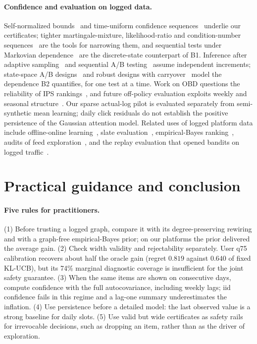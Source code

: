 \documentclass[sigconf,review,anonymous]{acmart}
\begin{document}
\paragraph{Confidence and evaluation on logged data.} Self-normalized bounds~\cite{abbasi2011improved} and time-uniform confidence sequences~\cite{howard2021confidence} underlie our certificates; tighter martingale-mixture, likelihood-ratio and condition-number sequences~\cite{flynn2023martingale,flynn2025kernel,emmenegger2023lr,lee2024glmcs,whitehouse2025vector,denoodt2026multivariate} are the tools for narrowing them, and sequential tests under Markovian dependence~\cite{sethi2026markovian} are the discrete-state counterpart of B1. Inference after adaptive sampling~\cite{du2025bvm,cho2024peak} and sequential A/B testing~\cite{kurennoy2025yeast,lindon2026delayed,kohavi2024false} assume independent increments; state-space A/B designs~\cite{shao2026statespace} and robust designs with carryover~\cite{wen2026robust} model the dependence B2 quantifies, for one test at a time. Work on OBD questions the reliability of IPS rankings~\cite{korovaitceva2026ips}, and future off-policy evaluation exploits weekly and seasonal structure~\cite{shimizu2025opfv}. Our sparse actual-log pilot is evaluated separately from semi-synthetic mean learning; daily click residuals do not establish the positive persistence of the Gaussian attention model. Related uses of logged platform data include offline-online learning~\cite{li2021unifying}, slate evaluation~\cite{kiyohara2024slate}, empirical-Bayes ranking~\cite{yang2024empirical,wang2021hybrid}, audits of feed exploration~\cite{vombatkere2024tiktok}, and the replay evaluation that opened bandits on logged traffic~\cite{li2010linucb}.

\section{Practical guidance and conclusion}\label{sec:conclusion}

\paragraph{Five rules for practitioners.} (1) Before trusting a logged graph, compare it with its degree-preserving rewiring and with a graph-free empirical-Bayes prior; on our platforms the prior delivered the average gain. (2) Check width validity and rejectability separately. User q75 calibration recovers about half the oracle gain (regret $0.819$ against $0.640$ of fixed KL-UCB), but its 74\% marginal diagnostic coverage is insufficient for the joint safety guarantee. (3) When the same items are shown on consecutive days, compute confidence with the full autocovariance, including weekly lags; iid confidence fails in this regime and a lag-one summary underestimates the inflation. (4) Use persistence before a detailed model: the last observed value is a strong baseline for daily slots. (5) Use valid but wide certificates as safety rails for irrevocable decisions, such as dropping an item, rather than as the driver of exploration.
\end{document}

